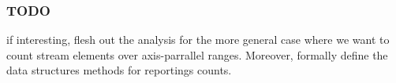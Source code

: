 \documentclass{article}
\begin{document}
\subsubsection*{TODO}
if interesting, flesh out the analysis for the more general case where we want to count stream elements over axis-parrallel ranges. Moreover, formally define the data structures methods for reportings counts.

\newpage

\end{document}

